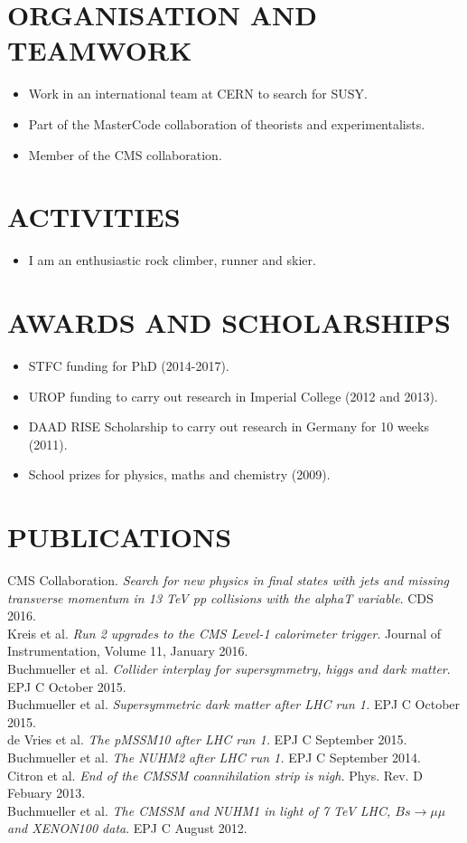 \documentclass[9pt]{res} %
\begin{document}
\begin{resume}
\section{ORGANISATION AND TEAMWORK}
\begin{itemize}
   \item Work in an international team at CERN to search for SUSY.
   \item Part of the MasterCode collaboration of theorists and experimentalists.
   \item Member of the CMS collaboration.
\end{itemize}

\section{ACTIVITIES} 
\begin{itemize}
\item I am an enthusiastic rock climber, runner and skier.
\end{itemize}

\section{AWARDS AND SCHOLARSHIPS}
\begin{itemize}
\item STFC funding for PhD (2014-2017).
\item UROP funding to carry out research in Imperial College (2012 and 2013).
\item DAAD RISE Scholarship to carry out research in Germany for 10 weeks (2011).
\item School prizes for physics, maths and chemistry (2009).
\end{itemize}

\section{PUBLICATIONS}
CMS Collaboration. \textit{Search for new physics in final states with jets and missing transverse momentum in 13 TeV pp collisions with the alphaT variable}. CDS 2016.\\
Kreis et al. \textit{Run 2 upgrades to the CMS Level-1 calorimeter trigger}. Journal of Instrumentation, Volume 11, January 2016.\\
Buchmueller et al. \textit{Collider interplay for supersymmetry, higgs and dark matter}. EPJ C October 2015.\\
Buchmueller et al. \textit{Supersymmetric dark matter after LHC run 1.} EPJ C October 2015.\\
de Vries et al. \textit{The pMSSM10 after LHC run 1.} EPJ C September 2015.\\
Buchmueller et al. \textit{The NUHM2 after LHC run 1.} EPJ C September 2014.\\
Citron et al. \textit{End of the CMSSM coannihilation strip is nigh.} Phys. Rev. D Febuary 2013.\\
Buchmueller et al. \textit{The CMSSM and NUHM1 in light of 7 TeV LHC, $Bs \rightarrow \mu\mu$ and XENON100 data}. EPJ C August 2012.




\end{resume}
\end{document}
